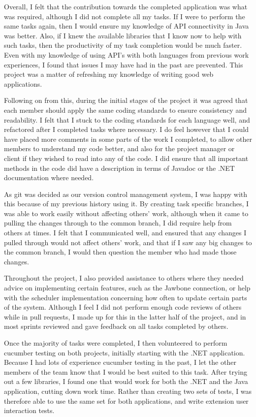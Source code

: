 Overall, I felt that the contribution towards the completed application was what was required, although I did not complete all my tasks. If I were to perform the same tasks again, then I would ensure my knowledge of API connectivity in Java was better. Also, if I knew the available libraries that I know now to help with such tasks, then the productivity of my task completion would be much faster. Even with my knowledge of using API’s with both languages from previous work experiences, I found that issues I may have had in the past are prevented. This project was a matter of refreshing my knowledge of writing good web applications. \par
Following on from this, during the initial stages of the project it was agreed that each member should apply the same coding standards to ensure consistency and readability. I felt that I stuck to the coding standards for each language well, and refactored after I completed tasks where necessary. I do feel however that I could have placed more comments in some parts of the work I completed, to allow other members to understand my code better, and also for the project manager or client if they wished to read into any of the code. I did ensure that all important methods in the code did have a description in terms of Javadoc or the .NET documentation where needed. \par
As git was decided as our version control management system, I was happy with this because of my previous history using it. By creating task specific branches, I was able to work easily without affecting others’ work, although when it came to pulling the changes through to the common branch, I did require help from others at times. I felt that I communicated well, and ensured that any changes I pulled through would not affect others’ work, and that if I saw any big changes to the common branch, I would then question the member who had made those changes. \par
Throughout the project, I also provided assistance to others where they needed advice on implementing certain features, such as the Jawbone connection, or help with the scheduler implementation concerning how often to update certain parts of the system. Although I feel I did not perform enough code reviews of others while in pull requests, I made up for this in the latter half of the project, and in most sprints reviewed and gave feedback on all tasks completed by others. \par
Once the majority of tasks were completed, I then volunteered to perform cucumber testing on both projects, initially starting with the .NET application. Because I had lots of experience cucumber testing in the past, I let the other members of the team know that I would be best suited to this task. After trying out a few libraries, I found one that would work for both the .NET and the Java application, cutting down work time. Rather than creating two sets of tests, I was therefore able to use the same set for both applications, and write extension user interaction tests. \par
